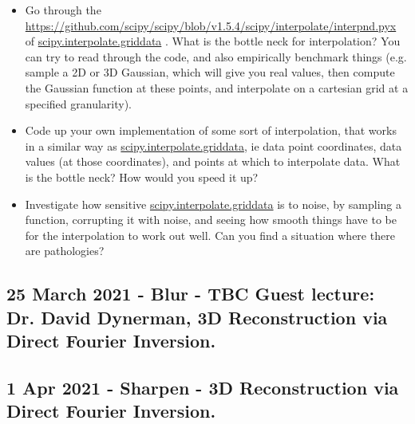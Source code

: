 \documentclass[11pt, oneside]{article}   	%
\begin{document}
\begin{itemize} 
	\item Go through the \href{source}{https://github.com/scipy/scipy/blob/v1.5.4/scipy/interpolate/interpnd.pyx} of \href{https://docs.scipy.org/doc/scipy/reference/generated/scipy.interpolate.griddata.html}{scipy.interpolate.griddata} . What is the bottle neck for interpolation? You can try to read through the code, and also empirically benchmark things (e.g. sample a 2D or 3D Gaussian, which will give you real values, then compute the Gaussian function at these points, and interpolate on a cartesian grid at a specified granularity).
	\item Code up your own implementation of some sort of interpolation, that works in a similar way as \href{https://docs.scipy.org/doc/scipy/reference/generated/scipy.interpolate.griddata.html}{scipy.interpolate.griddata}, ie data point coordinates, data values (at those coordinates), and points at which to interpolate data. What is the bottle neck? How would you speed it up? 
	\item Investigate how sensitive  \href{https://docs.scipy.org/doc/scipy/reference/generated/scipy.interpolate.griddata.html}{scipy.interpolate.griddata} is to noise, by sampling a function, corrupting it with noise, and seeing how smooth things have to be for the interpolation to work out well. Can you find a situation where there are pathologies? 
\end{itemize}

\subsection{25 March 2021 - Blur - TBC Guest lecture: Dr. David Dynerman, 3D Reconstruction via Direct Fourier Inversion.}

\subsection{1 Apr 2021 - Sharpen - 3D Reconstruction via Direct Fourier Inversion.}


\pagebreak
\end{document}
